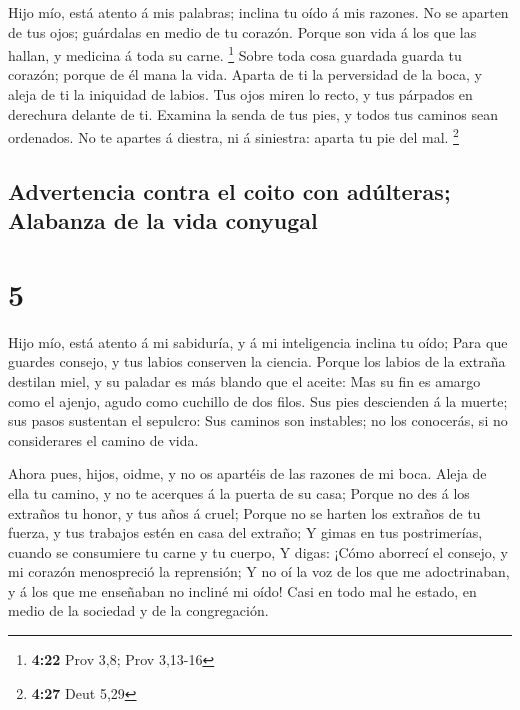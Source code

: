  Hijo mío, está atento á mis palabras; inclina tu oído á
mis razones.  No se aparten de tus ojos; guárdalas en medio
de tu corazón.  Porque son vida á los que las hallan, y
medicina á toda su carne. \footnote{\textbf{4:22} Prov 3,8; Prov 3,13-16}
 Sobre toda cosa guardada guarda tu corazón; porque de él
mana la vida.  Aparta de ti la perversidad de la boca, y
aleja de ti la iniquidad de labios.  Tus ojos miren lo
recto, y tus párpados en derechura delante de ti.  Examina
la senda de tus pies, y todos tus caminos sean ordenados. 
No te apartes á diestra, ni á siniestra: aparta tu pie del mal.
\footnote{\textbf{4:27} Deut 5,29}

\hypertarget{advertencia-contra-el-coito-con-aduxfalteras-alabanza-de-la-vida-conyugal}{%
\subsection{Advertencia contra el coito con adúlteras; Alabanza de la
vida
conyugal}\label{advertencia-contra-el-coito-con-aduxfalteras-alabanza-de-la-vida-conyugal}}

\hypertarget{section-4}{%
\section{5}\label{section-4}}

 Hijo mío, está atento á mi sabiduría, y á mi inteligencia
inclina tu oído;  Para que guardes consejo, y tus labios
conserven la ciencia.  Porque los labios de la extraña
destilan miel, y su paladar es más blando que el aceite: 
Mas su fin es amargo como el ajenjo, agudo como cuchillo de dos filos.
 Sus pies descienden á la muerte; sus pasos sustentan el
sepulcro:  Sus caminos son instables; no los conocerás, si
no considerares el camino de vida.

 Ahora pues, hijos, oidme, y no os apartéis de las razones
de mi boca.  Aleja de ella tu camino, y no te acerques á la
puerta de su casa;  Porque no des á los extraños tu honor, y
tus años á cruel;  Porque no se harten los extraños de tu
fuerza, y tus trabajos estén en casa del extraño;  Y gimas
en tus postrimerías, cuando se consumiere tu carne y tu cuerpo,
 Y digas: ¡Cómo aborrecí el consejo, y mi corazón
menospreció la reprensión;  Y no oí la voz de los que me
adoctrinaban, y á los que me enseñaban no incliné mi oído! 
Casi en todo mal he estado, en medio de la sociedad y de la
congregación.

